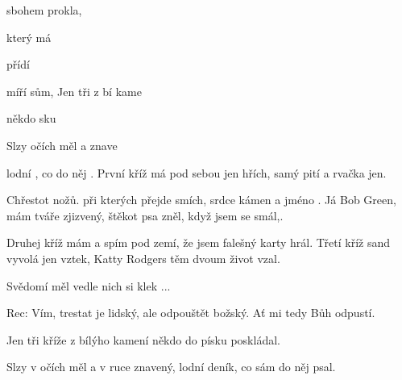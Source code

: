 
\zs
{} sbohem  prokla,

který  má  

 přídí  

míří sům,  
\ks
\zr
Jen tři  z bí kame

někdo sku 

Slzy  očích měl a  znave

lodní , co  do něj .
\kr
\zs
První kříž má pod sebou jen hřích, samý pití a rvačka jen.

Chřestot nožů. při kterých přejde smích, srdce kámen a jméno .
\ks
\zr  \kr
\zs
Já Bob Green, mám tváře zjizvený, štěkot psa zněl, když jsem se smál,.

Druhej kříž mám a spím pod zemí, že jsem falešný karty hrál.
\ks
\zr  \kr
\zs
Třetí kříž sand vyvolá jen vztek, Katty Rodgers těm dvoum život vzal.

Svědomí měl vedle nich si klek ...
\ks

Rec: Vím, trestat je lidský, ale odpouštět božský. Ať mi tedy Bůh odpustí.

\zr
Jen tři kříže z bílýho kamení někdo do písku poskládal.

Slzy v očích měl a v ruce znavený, lodní deník, co sám do něj psal.
\kr
\kp
























